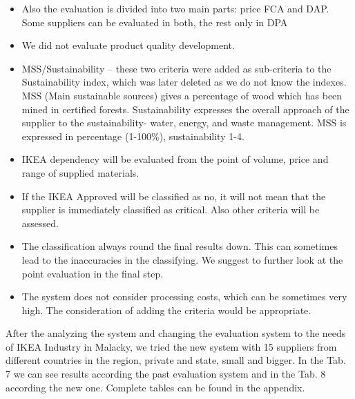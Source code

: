 \documentclass[oneside,12pt]{article}%
\begin{document}
\begin{itemize}
    \item Also the evaluation is divided into two main parts: price FCA and DAP. Some suppliers can be evaluated in both, the rest only in DPA
    \item We did not evaluate product quality development.
    \item MSS/Sustainability – these two criteria were added as sub-criteria to the Sustainability index, which was later deleted as we do not know the indexes. MSS (Main sustainable sources) gives a percentage of wood which has been mined in certified forests. Sustainability expresses the overall approach of the supplier to the sustainability- water, energy, and waste management. MSS is expressed in percentage (1-100\%), sustainability 1-4.
  \item IKEA dependency will be evaluated from the point of volume, price and range of supplied materials.
  \item If the IKEA Approved will be classified as no, it will not mean that the supplier is immediately classified as critical. Also other criteria will be assessed.
  \item The classification always round the final results down. This can sometimes lead to the inaccuracies in the classifying. We suggest to further look at the point evaluation in the final step.
  \item The system does not consider processing costs, which can be sometimes very high. The consideration of adding the criteria would be appropriate.

\end{itemize}


After the analyzing the system and changing the evaluation system to the needs of IKEA Industry in Malacky, we tried the new system with 15 suppliers from different countries in the region, private and state, small and bigger. In the Tab. 7 we can see results according the past evaluation system and in the Tab. 8 according the new one. Complete tables can be found in the appendix. \par
\end{document}
